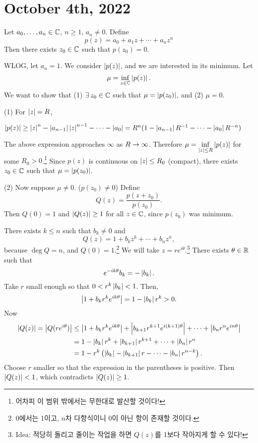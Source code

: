 \section*{October 4th, 2022}



  Let \(a_0, \dots, a_n \in \mathbb{C}\), \(n \geq 1\), \(a_n \neq 0\). Define
\[
    p(z) = a_0 + a_1 z + \cdots + a_n z^n
\]
Then there exists \(z_0 \in \mathbb{C}\) such that \(p(z_0) = 0\).

\pf WLOG, let \(a_n = 1\). We consider \(\left| p(z) \right|\), and we are interested in its minimum. Let
\[
    \mu = \inf_{z \in \mathbb{C}} \left| p(z) \right|.
\]
We want to show that (1) \(\exists z_0 \in \C\) such that \(\mu = \left| p(z_0) \right|\), and (2) \(\mu = 0\).

(1) For \(\left| z \right| = R\),
\begin{center}
    \(\left| p(z) \right| \geq \left| z \right|^n - \left| a_{n-1} \right|\left| z \right|^{n-1} - \cdots - \left| a_0 \right| = R^n(1-\left| a_{n-1} \right| R^{-1} - \cdots - \left| a_0 \right|R^{-n})\)
\end{center}
The above expression approaches \(\infty\) as \(R \rightarrow \infty\). Therefore \(\mu = \displaystyle \inf_{\left| z \right| \leq R} \left| p(z) \right|\) for some \(R_0 > 0\).\footnote{어차피 이 범위 밖에서는 무한대로 발산할 것이다!} Since \(p(z)\) is continuous on \(\left| z \right| \leq R_0\) (compact), there exists \(z_
0 \in \mathbb{C}\) such that \(\mu = \left| p(z_0) \right|\).

(2) Now suppose \(\mu \neq 0\). (\(p(z_0) \neq 0\)) Define
\[
    Q(z) = \frac{p(z + z_0)}{p(z_0)}.
\]
Then \(Q(0) = 1\) and \(\left| Q(z) \right| \geq 1\) for all \(z \in \mathbb{C}\), since \(p(z_0)\) was minimum.

There exists \(k \leq n\) such that \(b_k \neq 0\) and
\[
    Q(z) = 1 + b_k z^k + \cdots + b_n z^n,
\]
because \(\deg Q = n\), and \(Q(0) = 1\).\footnote{0에서는 1이고, \(n\)차 다항식이니 0이 아닌 항이 존재할 것이다.} We will take \(z = re^{i\theta}\).\footnote{Idea: 적당히 돌리고 줄이는 작업을 하면 \(Q(z)\)를 1보다 작아지게 할 수 있다!} There exists \(\theta \in \mathbb{R}\) such that
\[
    e^{-ik\theta} b_k = -\left| b_k \right|.
\]
Take \(r\) small enough so that \(0 < r^k \left| b_k \right| < 1\). Then,
\[
    \left| 1 + b_k r^ke^{ik\theta} \right| = 1 - \left| b_k \right|r^k > 0.
\]
Now
\[
    \begin{aligned}
        \left| Q(z) \right| = \left| Q(re^{i\theta}) \right| & \leq \left| 1 + b_kr^ke^{ik\theta} \right| + \left| b_{k+1} r^{k+1} e^{i(k+1)\theta} \right| + \cdots + \left| b_n r^n e^{in\theta} \right| \\
                                           & = 1 - \left| b_k \right|r^k + \left| b_{k+1} \right|r^{k+1} + \cdots + \left| b_n \right|r^n                                                \\
                                           & = 1 - r^k \left(\left| b_k \right| - \left| b_{k+1} \right|r - \cdots - \left| b_n \right|r^{n-k}\right).
    \end{aligned}
\]
Choose \(r\) smaller so that the expression in the parentheses is positive. Then \(\left| Q(z) \right| < 1\), which contradicts \(\left| Q(z) \right| \geq 1\).

